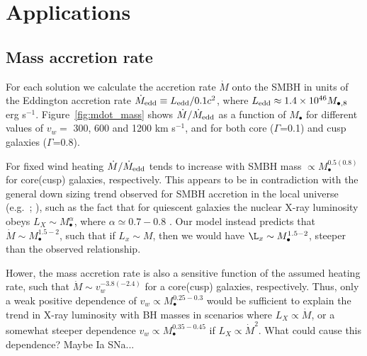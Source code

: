 \documentclass[usenatbib,fleqn]{mn2e}
\newcommand{\Mdot}{\dot{M}}
\newcommand{\Mbh}[1][]{M_{\bullet#1}}
\newcommand{\rIa}{r_{\rm Ia}}
\newcommand{\vwO}{v_{w}}
\begin{document}


\section{Applications}
\label{sec:applications}

\subsection{Mass accretion rate}
\label{sec:mdot}

For each solution we calculate the accretion rate $\dot{M}$ onto the
SMBH in units of the Eddington accretion rate $\dot{M}_{\rm edd}
\equiv L_{\rm edd}/0.1 c^{2}$, where $L_{\rm edd} \approx 1.4\times
10^{46}M_{\bullet,8}$ erg s$^{-1}$.  Figure~\ref{fig:mdot_mass} shows
$\dot{M}/\dot{M}_{\rm edd}$ as a function of $\Mbh$ for different
values of $\vwO =$ 300, 600 and 1200 km s$^{-1}$, and for both core
($\Gamma$=0.1) and cusp galaxies ($\Gamma$=0.8).

For fixed wind heating $\dot{M}/\dot{M}_{\rm edd}$ tends to increase
with SMBH mass $\propto M_{\bullet}^{0.5(0.8)}$ for core(cusp)
galaxies, respectively.  This appears to be in contradiction with the
general down sizing trend observed for SMBH accretion in the local
universe (e.g.~\citealt{Heckman+04}; \citealt{Gallo+08}), such as the
fact that for quiescent galaxies the nuclear X-ray luminosity obeys
$L_X \sim \Mbh^\alpha$, where $\alpha\simeq 0.7-0.8$
\citep{Miller+15}.  Our model instead predicts that $\Mdot
\sim \Mbh^{1.5-2}$, such that if $L_x\sim M$, then we would have $\L_x
\sim \Mbh^{1.5-2}$, steeper than the observed relationship.

Hower, the mass accretion rate is also a sensitive function of the assumed heating rate, such that $\dot{M}\sim\vwO^{-3.8(-2.4)}$ for a core(cusp) galaxies, respectively.  Thus, only a weak positive dependence of $v_{w} \propto M_{\bullet}^{0.25-0.3}$ would be sufficient to explain the trend in X-ray luminosity with BH masses in scenarios where $L_X \propto \dot{M}$, or a somewhat steeper dependence $v_{w} \propto M_{\bullet}^{0.35-0.45}$ if $L_{X} \propto \dot{M}^{2}$.  What could cause this dependence?  Maybe Ia SNa...
\end{document}
